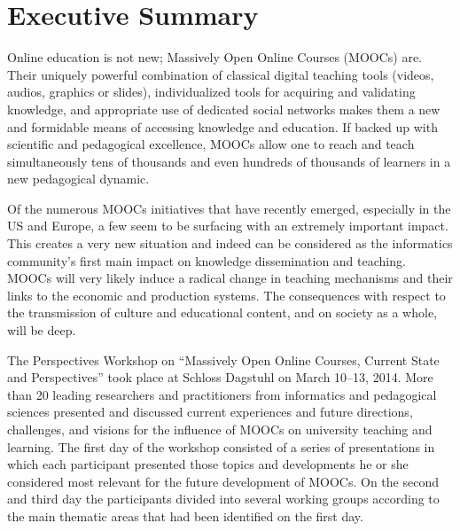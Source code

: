 
\section*{Executive Summary}





Online education is not new; Massively Open Online Courses (MOOCs)
are. Their uniquely powerful combination of classical digital teaching
tools (videos, audios, graphics or slides), individualized tools for
acquiring and validating knowledge, and appropriate use of dedicated
social networks makes them a new and formidable means of accessing
knowledge and education. If backed up with scientific and pedagogical
excellence, MOOCs allow one to reach and teach simultaneously tens of
thousands and even hundreds of thousands of learners in a new
pedagogical dynamic.

Of the numerous MOOCs initiatives that have recently emerged, especially
in the US and Europe, a few seem to be surfacing with an extremely
important impact. This creates a very new situation and indeed can be
considered as the informatics community's first main impact on knowledge
dissemination and teaching. MOOCs will very likely induce a radical
change in teaching mechanisms and their links to the economic and
production systems. The consequences with respect to the transmission of
culture and educational content, and on society as a whole, will be
deep.

The Perspectives Workshop on ``Massively Open Online Courses, Current
State and Perspectives'' took place at Schloss Dagstuhl on March 10--13,
2014. More than 20 leading researchers and practitioners from
informatics and pedagogical sciences presented and discussed current
experiences and future directions, challenges, and visions for the
influence of MOOCs on university teaching and learning.  The first day
of the workshop consisted of a series of presentations in which each
participant presented those topics and developments he or she considered
most relevant for the future development of MOOCs. On the second and
third day the participants divided into several working groups according
to the main thematic areas that had been identified on the first day.


